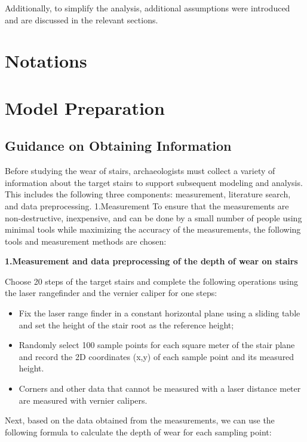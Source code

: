 \documentclass{mcmthesis}
\begin{document}
Additionally, to simplify the analysis, additional assumptions were introduced and are discussed in the relevant sections.
\section{Notations}%
\section{Model Preparation}
\subsection{Guidance on Obtaining Information}
Before studying the wear of stairs, archaeologists must collect a variety of information about the target stairs to support subsequent modeling and analysis. This includes the following three components: measurement, literature search, and data preprocessing.
1.Measurement
To ensure that the measurements are non-destructive, inexpensive, and can be done by a small number of people using minimal tools while maximizing the accuracy of the measurements, the following tools and measurement methods are chosen:


\textbf{1.Measurement and data preprocessing of the depth of wear on stairs}

Choose 20 steps of the target stairs and complete the following operations using the laser rangefinder and the vernier caliper for one steps:

\begin{itemize}[label=$\star$] %
\item Fix the laser range finder in a constant horizontal plane using a sliding table and set the height of the stair root as the reference height;

\item Randomly select 100 sample points for each square meter of the stair plane and record the 2D coordinates (x,y) of each sample point and its measured height.

\item Corners and other data that cannot be measured with a laser distance meter are measured with vernier calipers.

\end{itemize}

Next, based on the data obtained from the measurements, we can use the following formula to calculate the depth of wear for each sampling point:
\end{document}
